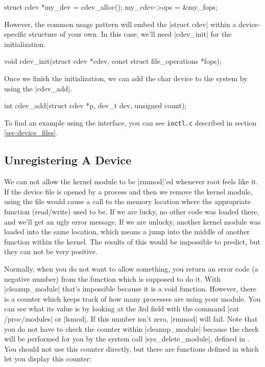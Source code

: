 \documentclass[10pt, oneside]{book}
\begin{document}
\begin{code}
struct cdev *my_dev = cdev_alloc();
my_cdev->ops = &my_fops;
\end{code}

However, the common usage pattern will embed the \cpp|struct cdev| within a device-specific structure of your own.
In this case, we'll need \cpp|cdev_init| for the initialization.

\begin{code}
void cdev_init(struct cdev *cdev, const struct file_operations *fops);
\end{code}

Once we finish the initialization, we can add the char device to the system by using the \cpp|cdev_add|.

\begin{code}
int cdev_add(struct cdev *p, dev_t dev, unsigned count);
\end{code}

To find an example using the interface, you can see \verb|ioctl.c| described in section \ref{sec:device_files}.

\subsection{Unregistering A Device}
\label{sec:unregister_device}
We can not allow the kernel module to be \sh|rmmod|'ed whenever root feels like it.
If the device file is opened by a process and then we remove the kernel module, using the file would cause a call to the memory location where the appropriate function (read/write) used to be.
If we are lucky, no other code was loaded there, and we'll get an ugly error message.
If we are unlucky, another kernel module was loaded into the same location, which means a jump into the middle of another function within the kernel.
The results of this would be impossible to predict, but they can not be very positive.

Normally, when you do not want to allow something, you return an error code (a negative number) from the function which is supposed to do it.
With \cpp|cleanup_module| that's impossible because it is a void function.
However, there is a counter which keeps track of how many processes are using your module.
You can see what its value is by looking at the 3rd field with the command \sh|cat /proc/modules| or \sh|lsmod|.
If this number isn't zero, \sh|rmmod| will fail.
Note that you do not have to check the counter within \cpp|cleanup_module| because the check will be performed for you by the system call \cpp|sys_delete_module|, defined in .
You should not use this counter directly, but there are functions defined in  which let you display this counter:
\end{document}
